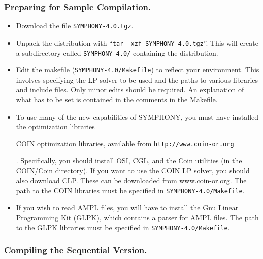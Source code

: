 \subsubsection{Preparing for Sample Compilation.}

\begin{itemize}

        \item Download the file {\tt SYMPHONY-4.0.tgz}.

        \item Unpack the distribution with ``{\tt tar -xzf
        SYMPHONY-4.0.tgz}''. This will create a subdirectory called
        {\tt SYMPHONY-4.0/} containing the distribution.
        
        \item Edit the makefile ({\tt SYMPHONY-4.0/Makefile}) to reflect your
              environment. This involves specifying the LP solver to be used
              and the paths to various libraries and include files. Only minor
              edits should be required. An explanation of what has to be set
              is contained in the comments in the Makefile. 

        \item To use many of the new capabilities of SYMPHONY, you must have
	      installed the
	      \emph{}
	      optimization libraries 
	      \begin{latexonly} 
	      COIN optimization libraries, available from 
	      \texttt{http://www.coin-or.org}
	      \end{latexonly}. 
	      Specifically, you should install OSI, CGL, and
	      the Coin utilities (in the COIN/Coin directory). If you want to
	      use the COIN LP solver, you should also download CLP. These can
	      be downloaded from www.coin-or.org. The path to the COIN
	      libraries must be specified in \texttt{SYMPHONY-4.0/Makefile}.

        \item If you wish to read AMPL files, you will have to install the Gnu
	      Linear Programming Kit (GLPK), which contains a parser for AMPL
	      files. The path to the GLPK libraries must be specified in
	      \texttt{SYMPHONY-4.0/Makefile}.

\end{itemize}
        
\subsubsection{Compiling the Sequential Version.}

